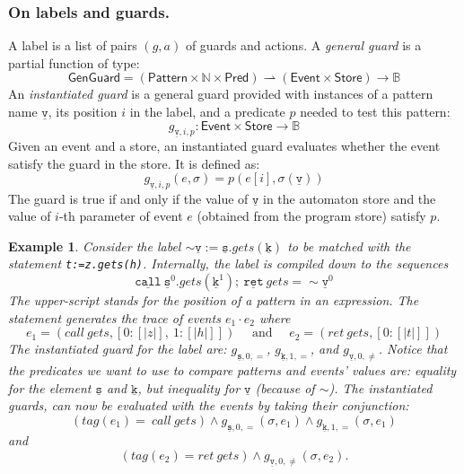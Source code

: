 \documentclass{sigplanconf}[10pt] %
\newcommand{\B}{\ensuremath{\mathbb{B}}}
\newcommand{\N}{\ensuremath{\mathbb{N}}}
\newcommand{\pattern}[1]{\ensuremath{\mathtt{\underline{#1}}}}
\newcommand{\pmap}{\rightharpoonup}
\newcommand{\set}[1]{\ensuremath{\mathsf{#1}}}
\newtheorem{example}{Example}
\begin{document}
\subsubsection{On labels and guards.}
 A label is a list of pairs $(g,a)$ of guards and actions. A  {\em general guard} is a partial function of type:
\[
\set{GenGuard} = (\set{Pattern} \times \N \times \set{Pred}) \pmap (\set{Event}\times\set{Store}) \to \B
\]
An {\em instantiated guard} is a general guard provided with instances of a pattern  name $\pattern v$,  its position $i$ in the label, and a predicate $p$ needed to test this pattern:
\[
g_{\pattern{v},i,p} : \set{Event}\times\set{Store} \to \B
\]
Given an event and a store, an instantiated guard  evaluates whether the event satisfy the guard in the store. It is defined as:
\newcommand{\sem}[1]{[ \! | #1 | \! ]}
\[
g_{\pattern{v},i,p}(e, \sigma) = p(e[i],\sigma(\pattern v))
\] The guard is true if and only if the value of $\pattern{v}$ in the automaton store 
and the value of $i$-th parameter of  event $e$ (obtained from the program store) satisfy $p$.
\begin{example}
Consider the label 
 $\sim \pattern {v} := \pattern {s}.gets(\pattern {k})$ to be matched with the statement 
 {\tt t:=z.gets(h)}. Internally,  the label is compiled down to the sequences 
\[
\pattern{call} \  \pattern{s}^0 .gets(\pattern {k}^1);  \ \pattern{ret} \ gets = \sim \pattern {v}^0   
\] The upper-script stands for the position of a pattern in an expression. The statement generates the trace of events $e_1 \cdot e_2$ where 
\[ 
 e_1=(call \ gets, [0: \sem{z}, \ 1: \sem{h}])  \quad \mbox{ and }  \quad e_2= (ret \ gets, [0: \sem{t}])
\] 
The instantiated guard for the label are:
 $g_{\pattern{s},0,=}$, $g_{\pattern{k},1,=}$, and  $g_{\pattern{v},0, \neq}$.  
Notice that the predicates we want to use to compare patterns and events' values are: equality for the element $\pattern{s}$ and $\pattern{k}$, 
but inequality for \pattern{v} (because of $\sim$).
The instantiated guards, can now be evaluated with the events by taking their conjunction:
\[ 
 (tag(e_1)= \ call \ gets) \wedge g_{\pattern{s},0,=}(\sigma,e_1) \wedge g_{\pattern{k},1,=}(\sigma, e_1) 
\] and 
\[ 
 (tag(e_2)= ret \ gets) \wedge g_{\pattern{v},0,\neq}(\sigma,e_2).
\]
\end{example}
\end{document}
